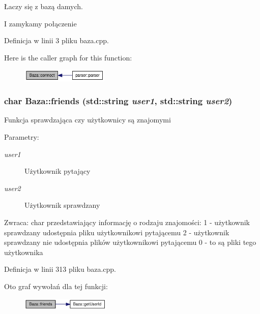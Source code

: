 Łaczy się z bazą damych. 



I zamykamy połączenie 

Definicja w linii 3 pliku baza.cpp.

Here is the caller graph for this function:\nopagebreak
\begin{figure}[H]
\begin{center}
\leavevmode
\includegraphics[width=118pt]{d8/d84/a00001_bef61cc396e46d347a47c75e9ef8dfde_icgraph}
\end{center}
\end{figure}
\hypertarget{a00001_170c8dad434281805524834ace0a3109}{
\subsubsection[{friends}]{\setlength{\rightskip}{0pt plus 5cm}char Baza::friends (std::string {\em user1}, \/  std::string {\em user2})}}
\label{d8/d84/a00001_170c8dad434281805524834ace0a3109}


Funkcja sprawdzająca czy użytkownicy są znajomymi \begin{Desc}
\item[Parametry:]
\begin{description}
\item[{\em user1}]Użytkownik pytający \item[{\em user2}]Użytkownik sprawdzany \end{description}
\end{Desc}
\begin{Desc}
\item[Zwraca:]char przedstawiający informację o rodzaju znajomości: 1 - użytkownik sprawdzany udostępnia pliku użytkownikowi pytającemu 2 - użytkownik sprawdzany nie udostępnia plików użytkownikowi pytającemu 0 - to są pliki tego użytkownika \end{Desc}


Definicja w linii 313 pliku baza.cpp.

Oto graf wywołań dla tej funkcji:\nopagebreak
\begin{figure}[H]
\begin{center}
\leavevmode
\includegraphics[width=121pt]{d8/d84/a00001_170c8dad434281805524834ace0a3109_cgraph}
\end{center}
\end{figure}


